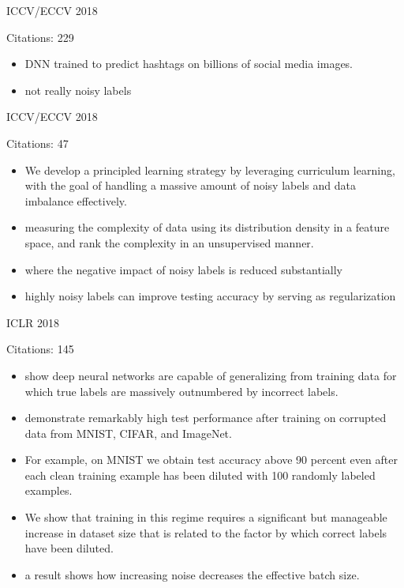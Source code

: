 \documentclass[11pt]{article}
\begin{document}
\noindent ICCV/ECCV 2018

\noindent Citations: 229

\begin{itemize}
\item DNN trained to predict hashtags on billions of social media images.
\item not really noisy labels
\end{itemize}

\vspace{2cm}

\noindent ICCV/ECCV 2018

\noindent Citations: 47

\begin{itemize}
\item We develop a principled learning strategy by leveraging curriculum learning, with the goal of handling a massive amount of noisy labels and data imbalance effectively.
\item measuring the complexity of data using its distribution density in a feature space, and rank the complexity in an unsupervised manner.
\item where the negative impact of noisy labels is reduced substantially
\item highly noisy labels can improve testing accuracy by serving as regularization
\end{itemize}

\vspace{2cm}

\noindent ICLR 2018

\noindent Citations: 145

\begin{itemize}
\item show deep neural networks are capable of generalizing from training data for which true labels are massively outnumbered by incorrect labels.
\item demonstrate remarkably high test performance after training on corrupted data from MNIST, CIFAR, and ImageNet.
\item For example, on MNIST we obtain test accuracy above 90 percent even after each clean training example has been diluted with 100 randomly labeled examples.
\item We show that training in this regime requires a significant but manageable increase in dataset size that is related to the factor by which correct labels have been diluted.
\item a result shows how increasing noise decreases the effective batch size.
\end{itemize}
\end{document}
